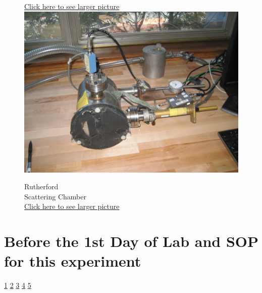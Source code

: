 \documentclass{../lab}
\begin{document}
\begin{figure}[H]
{  \href{http://experimentationlab.berkeley.edu/sites/default/files/images/RUT_Valve.jpg}{Click here to see larger picture}}
  \label{fig:Valve}
\endminipage\hfill
{}
  \href{http://experimentationlab.berkeley.edu/sites/default/files/images/RUT_Chamber.jpg}{\includegraphics[width=\linewidth,keepaspectratio]{images/RUT_Chamber.jpg}}
  \caption{Rutherford \\ Scattering Chamber \\ \href{http://experimentationlab.berkeley.edu/sites/default/files/images/RUT_Chamber.jpg}{Click here to see larger picture}}\label{fig:RUTChamber}
\endminipage
\end{figure}

\section{Before the 1st Day of Lab and SOP for this experiment}

\signatures \hyperlink{PN Detector}{1} \hyperlink{Signals}{2} \hyperlink{Measurements}{3} \hyperlink{Trial Run Analysis}{4} \hyperlink{Spectrum}{5} 
\end{document}
